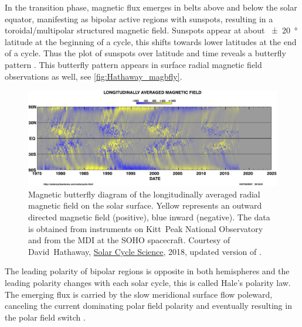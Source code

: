 In the transition phase, magnetic flux emerges in belts above and below the solar equator, manifesting as bipolar active regions with sunspots, resulting in a toroidal/multipolar structured magnetic field. Sunspots appear at about \SI{+-20}{\degree} latitude at the beginning of a cycle, this shifts towards lower latitudes at the end of a cycle. Thus the plot of sunspots over latitude and time reveals a butterfly pattern \citep{Maunder1904}. This butterfly pattern appears in surface radial magnetic field observations as well, see \autoref{fig:Hathaway_magbfly}.
\begin{figure}[htb]
	\centering
	\includegraphics[width=\textwidth]{figures_of_others/images/Hathaway_magbfly_201801_cropped.png}
	\caption[Courtesy of David~Hathaway, \href{http://solarcyclescience.com/solarcycle.html}{Solar Cycle Science}, 2018, updated version of {\citet[Fig.~17]{Hathaway2015}}.]
	{Magnetic butterfly diagram of the longitudinally averaged radial magnetic field on the solar surface. Yellow represents an outward directed magnetic field (positive), blue inward (negative). The data is obtained from instruments on Kitt~Peak National Observatory and from the MDI at the SOHO spacecraft. Courtesy of David~Hathaway, \href{http://solarcyclescience.com/solarcycle.html}{Solar Cycle Science}, 2018, updated version of \citet[Fig.~17]{Hathaway2015}.}
	\label{fig:Hathaway_magbfly}
\end{figure}
The leading polarity of bipolar regions is opposite in both hemispheres and the leading polarity changes with each solar cycle, this is called Hale's polarity law. The emerging flux is carried by the slow meridional surface flow poleward, canceling the current dominating polar field polarity and eventually resulting in the polar field switch \citep{Hathaway2015}.

